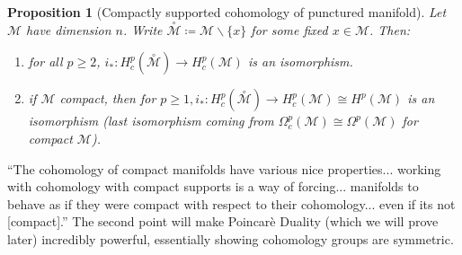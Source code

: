 \documentclass[10pt]{article}
\theoremstyle{plain}
\newtheorem{prop}[thm]{Proposition}
\theoremstyle{definition}
\newcommand{\man}{\mathcal{M}}
\newcommand{\xman}{x\in\man}
\newcommand{\pformman}[1]{\Omega^{#1}(\man)}
\newcommand{\compactpformman}[1]{\Omega^{#1}_c(\man)}
\newcommand{\cohomman}[1]{H^{#1}(\man)}
\newcommand{\compactcohomman}[1]{H_c^{#1}(\man)}
\newcommand{\puncman}{\overset{\circ}{\man}}
\begin{document}
\begin{prop}[Compactly supported cohomology of punctured manifold]
Let $\man $ have dimension $n$. Write $\puncman \coloneqq \man \backslash \{x\}$ for some fixed $\xman$. Then:\begin{enumerate}
    \item for all $p \geq 2$, $i_* : H^p_c(\puncman) \to \compactcohomman{p}$ is an isomorphism.
    \item if $\man$ compact, then for $p\geq 1, i_* : H_c^p(\puncman) \to \compactcohomman{p} \cong\cohomman{p}$ is an isomorphism (last isomorphism coming from $\compactpformman{p} \cong \pformman{p}$ for compact $\man$).
\end{enumerate}
\end{prop}
``The cohomology of compact manifolds have various nice properties... working with cohomology with compact supports is a way of forcing... manifolds to behave as if they were compact with respect to their cohomology... even if its not [compact].'' The second point will make Poincar\`e Duality (which we will prove later) incredibly powerful, essentially showing cohomology groups are symmetric.
\end{document}
